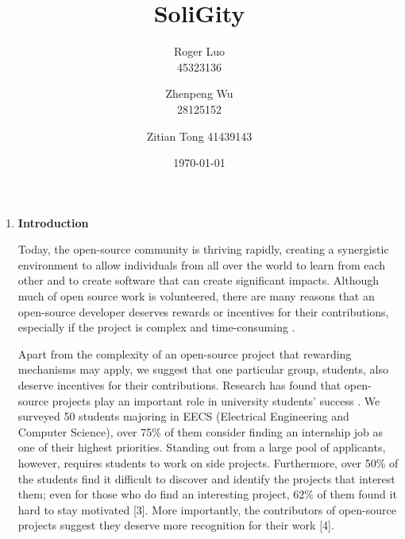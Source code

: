\documentclass[12pt]{article}
\title{SoliGity}
\author{  
  Roger Luo\\
  45323136
  \and
  Zhenpeng Wu\\
  28125152 
  \and
  Zitian Tong
  41439143
}
\date{\today}
\renewcommand{\_}{\kern-1.5pt\textunderscore\kern-1.5pt}
\begin{document}
\maketitle

\pagebreak

\vspace{\baselineskip}
\begin{enumerate}
	\item \textbf{Introduction}\par

        Today, the open-source community is thriving rapidly, creating a synergistic environment to allow individuals from all over the world to learn from each other and to create software that can create significant impacts. Although much of open source work is volunteered, there are many reasons that an open-source developer deserves rewards or incentives for their contributions, especially if the project is complex and time-consuming \cite{coin_center}.   \par

        Apart from the complexity of an open-source project that rewarding mechanisms may apply, we suggest that one particular group, students, also deserve incentives for their contributions. Research has found that open-source projects play an important role in university students’ success \cite{blockchain_pulse_ibm_blockchain_blog_2020}. We surveyed 50 students majoring in EECS (Electrical Engineering and Computer Science), over 75\% of them consider finding an internship job as one of their highest priorities. Standing out from a large pool of applicants, however, requires students to work on side projects. Furthermore, over 50\% of the students find it difficult to discover and identify the projects that interest them; even for those who do find an interesting project, 62\% of them found it hard to stay motivated [3]. More importantly, the contributors of open-source projects suggest they deserve more recognition for their work [4]. \par


\end{enumerate}
\end{document}
